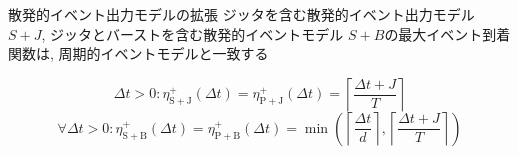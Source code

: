 \begin{frame}{散発的イベント出力モデルの拡張}
    ジッタを含む散発的イベント出力モデル $S+J$, ジッタとバーストを含む散発的イベントモデル $S+B$の最大イベント到着関数は, 周期的イベントモデルと一致する

    \begin{equation*}
        \Delta t>0: \eta_{\mathrm{S}+\mathrm{J}}^{+}(\Delta t)=\eta_{\mathrm{P}+\mathrm{J}}^{+}(\Delta t)=\left\lceil\frac{\Delta t+J}{T}\right\rceil
    \end{equation*}
    \begin{equation*}
        \forall \Delta t>0: \eta_{\mathrm{S}+\mathrm{B}}^{+}(\Delta t)=\eta_{\mathrm{P}+\mathrm{B}}^{+}(\Delta t)=\min \left(\left\lceil\frac{\Delta t}{d}\right\rceil,\left\lceil\frac{\Delta t+J}{T}\right\rceil\right)
    \end{equation*}
\end{frame}




